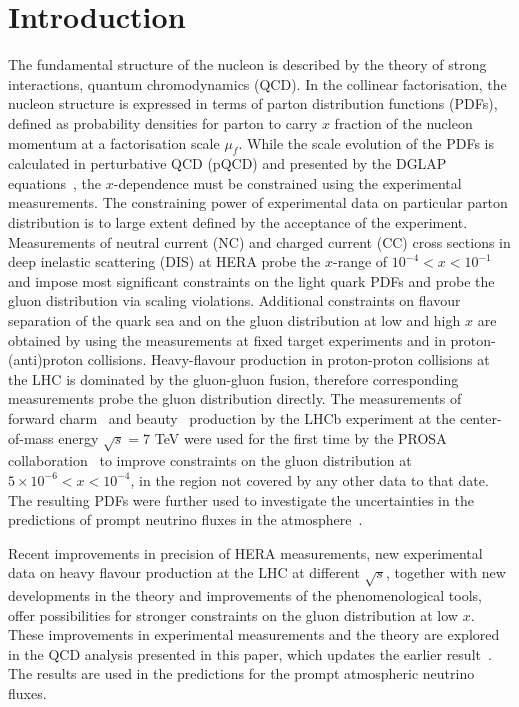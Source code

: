 \documentclass[12pt]{article}
\begin{document}
\section{Introduction}
\label{sect:intro}

The fundamental structure of the nucleon is described by the theory of strong interactions, quantum chromodynamics (QCD).
In the collinear factorisation, the nucleon structure is expressed in terms of parton distribution functions (PDFs), defined 
as probability densities for parton to carry $x$ fraction of the nucleon momentum at a factorisation scale $\mu_f$. While the 
scale evolution of the PDFs is calculated in perturbative QCD (pQCD) and presented by the DGLAP equations~\cite{Dokshitzer:1977sg,Gribov:1972ri,Altarelli:1977zs,Curci:1980uw,Furmanski:1980cm,Moch:2004pa,Vogt:2004mw}, the 
$x$-dependence must be constrained using the experimental measurements. The constraining power of experimental data 
on particular parton distribution is to large extent defined by the acceptance of the experiment. Measurements of 
neutral current (NC) and charged current (CC) cross sections in deep inelastic scattering (DIS) at HERA probe the $x$-range of $10^{-4}<x<10^{-1}$ and impose most significant constraints on the light quark PDFs and probe the gluon distribution via scaling violations. Additional constraints on flavour separation of the quark sea and on the gluon distribution at low and high $x$ are obtained by using the measurements at fixed target experiments and in proton-(anti)proton collisions. Heavy-flavour production in proton-proton collisions at the LHC is dominated by the gluon-gluon fusion, therefore corresponding measurements probe the gluon distribution directly. The measurements of forward charm~\cite{Aaij:2013mga} and beauty~\cite{Aaij:2013noa} production by the LHCb experiment at the center-of-mass energy $\sqrt{s}=7$ TeV were used for the first time by the PROSA collaboration~\cite{Zenaiev:2015rfa} to improve constraints on the gluon distribution at $5 \times 10^{-6}< x < 10^{-4}$, in the region not covered by any other data to that date. The resulting PDFs were further used to investigate the uncertainties in the predictions of prompt neutrino fluxes in the atmosphere~\cite{Garzelli:2016xmx}.       

Recent improvements in precision of HERA measurements, new experimental data on heavy flavour production at the LHC at 
different $\sqrt{s}$, together with new developments in the theory and improvements of the phenomenological tools, offer 
possibilities for stronger constraints on the gluon distribution at low $x$. These improvements in experimental measurements 
and the theory are explored in the QCD analysis presented in this paper, which updates the earlier result~\cite{Zenaiev:2015rfa}. The results are used in the predictions for the prompt atmospheric neutrino fluxes. 
\end{document}
